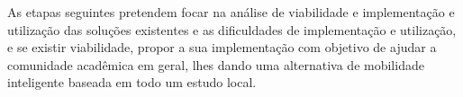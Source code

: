 
As etapas seguintes pretendem focar na análise de viabilidade e implementação e utilização das soluções existentes e as dificuldades de implementação e utilização, e se existir viabilidade, propor a sua implementação com objetivo de ajudar a comunidade acadêmica em geral, lhes dando uma alternativa de mobilidade inteligente baseada em todo um estudo local. %

    %

